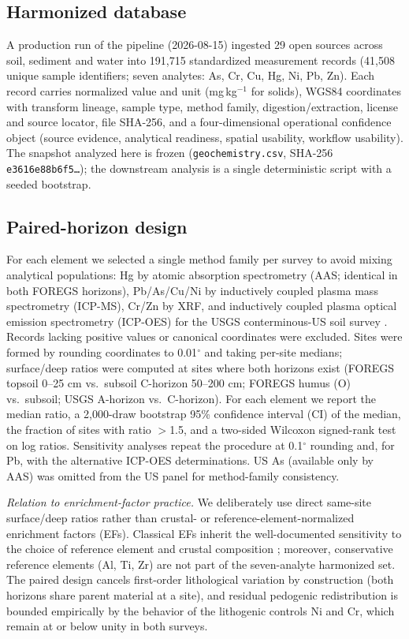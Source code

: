 \documentclass[11pt]{article}
\begin{document}
\subsection{Harmonized database}
A production run of the pipeline (2026-08-15) ingested 29 open sources across
soil, sediment and water into 191{,}715 standardized measurement records
(41{,}508 unique sample identifiers; seven analytes: As, Cr, Cu, Hg, Ni, Pb,
Zn). Each
record carries normalized value and unit (mg\,kg$^{-1}$ for solids), WGS84
coordinates with transform lineage, sample type, method family,
digestion/extraction, license and source locator, file SHA-256, and a
four-dimensional operational confidence object (source evidence, analytical
readiness, spatial usability, workflow usability). The snapshot analyzed here
is frozen (\texttt{geochemistry.csv},
SHA-256 \texttt{e3616e88b6f5\ldots}); the downstream analysis is a single
deterministic script with a seeded bootstrap.

\subsection{Paired-horizon design}
For each element we selected a single method family per survey to avoid
mixing analytical populations: Hg by atomic absorption spectrometry (AAS;
identical in both FOREGS horizons), Pb/As/Cu/Ni by inductively coupled
plasma mass spectrometry (ICP-MS), Cr/Zn by XRF, and inductively coupled
plasma optical emission spectrometry (ICP-OES) for the USGS conterminous-US
soil survey \cite{smith2013}. Records
lacking positive values or canonical coordinates were excluded. Sites were
formed by rounding coordinates to 0.01$^{\circ}$ and taking per-site medians;
surface/deep ratios were computed at sites where both horizons exist
(FOREGS topsoil 0--25 cm vs.\ subsoil C-horizon 50--200 cm; FOREGS humus (O)
vs.\ subsoil; USGS A-horizon vs.\ C-horizon). For each element we report the
median ratio, a 2{,}000-draw bootstrap 95\% confidence interval (CI) of the
median, the fraction of
sites with ratio $>$1.5, and a two-sided Wilcoxon signed-rank test on log
ratios. Sensitivity analyses repeat the procedure at 0.1$^{\circ}$ rounding
and, for Pb, with the alternative ICP-OES determinations. US As (available
only by AAS) was omitted from the US panel for method-family consistency.

\emph{Relation to enrichment-factor practice.} We deliberately use direct
same-site surface/deep ratios rather than crustal- or
reference-element-normalized enrichment factors (EFs). Classical EFs inherit the
well-documented sensitivity to the choice of reference element and crustal
composition \cite{reimann2005}; moreover, conservative reference elements
(Al, Ti, Zr) are not part of the seven-analyte harmonized set. The paired
design cancels first-order lithological variation by construction (both
horizons share parent material at a site), and residual pedogenic
redistribution is bounded empirically by the behavior of the lithogenic
controls Ni and Cr, which remain at or below unity in both surveys.
\end{document}
